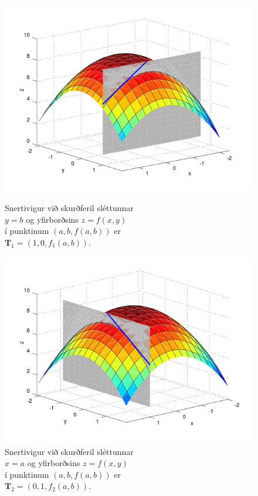  
 \begin{figure}[!h]
        \centering
        \begin{minipage}{.5\textwidth}
            \centering
            \includegraphics[width=1\linewidth]{xpart.png}
            \caption*{Snertivigur við skurðferil sléttunnar \\ $y=b$ og yfirborðsins $z = f(x,y)$ \\ í punktinum $(a,b,f(a,b))$ er \\ $\mathbf{T}_1 = (1,0,f_1(a,b))$.}
        \end{minipage}%
        \begin{minipage}{.5\textwidth}
            \centering
            \includegraphics[width=1\linewidth]{ypart.png}
            \caption*{Snertivigur við skurðferil sléttunnar \\ $x=a$ og yfirborðsins $z = f(x,y)$ \\ í punktinum $(a,b,f(a,b))$ er \\ $\mathbf{T}_2 = (0,1,f_2(a,b))$.}
        \end{minipage}
    \end{figure}
 


